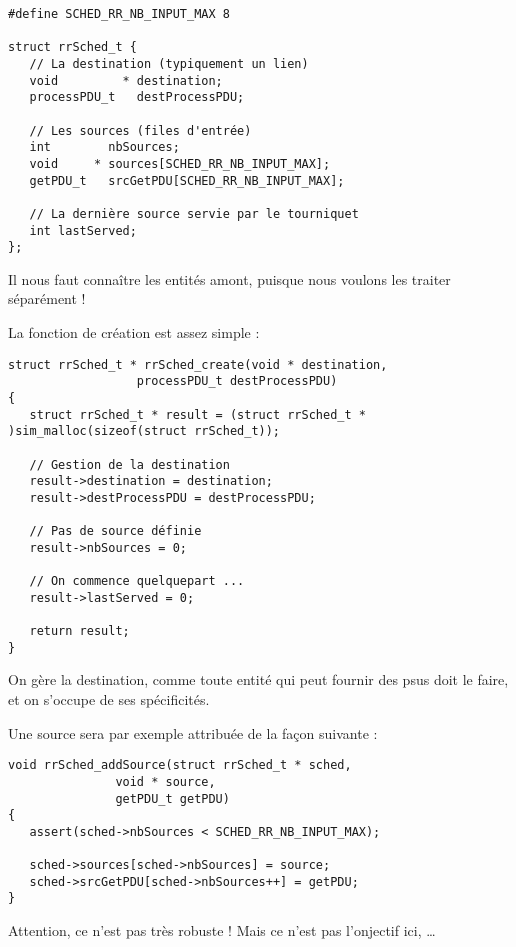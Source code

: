 \documentclass{article}
\begin{document}
\begin{verbatim}
#define SCHED_RR_NB_INPUT_MAX 8

struct rrSched_t {
   // La destination (typiquement un lien)
   void         * destination;
   processPDU_t   destProcessPDU;

   // Les sources (files d'entrée)
   int        nbSources;
   void     * sources[SCHED_RR_NB_INPUT_MAX];
   getPDU_t   srcGetPDU[SCHED_RR_NB_INPUT_MAX];

   // La dernière source servie par le tourniquet
   int lastServed;
};
\end{verbatim}

   Il nous faut connaître les entités amont, puisque nous voulons les
traiter séparément !

   La fonction de création est assez simple :

\begin{verbatim}
struct rrSched_t * rrSched_create(void * destination,
				  processPDU_t destProcessPDU)
{
   struct rrSched_t * result = (struct rrSched_t * )sim_malloc(sizeof(struct rrSched_t));

   // Gestion de la destination
   result->destination = destination;
   result->destProcessPDU = destProcessPDU;

   // Pas de source définie
   result->nbSources = 0;

   // On commence quelquepart ...
   result->lastServed = 0;

   return result;
}
\end{verbatim}

   On gère la destination, comme toute entité qui peut fournir des
{\sc psu}s doit le faire, et on s'occupe de ses spécificités.

    Une source sera par exemple attribuée de la façon suivante :

\begin{verbatim}
void rrSched_addSource(struct rrSched_t * sched,
		       void * source,
		       getPDU_t getPDU)
{
   assert(sched->nbSources < SCHED_RR_NB_INPUT_MAX);

   sched->sources[sched->nbSources] = source;
   sched->srcGetPDU[sched->nbSources++] = getPDU;
}
\end{verbatim}

   Attention, ce n'est pas très robuste ! Mais ce n'est pas l'onjectif
ici, \ldots

%
\end{document}
